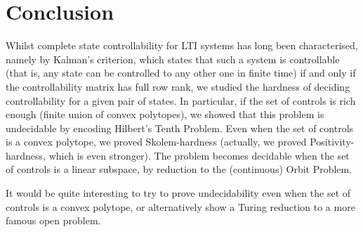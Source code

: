 \section{Conclusion}

Whilst complete state controllability for LTI systems has long been characterised, namely by Kalman's criterion, which states that such a system is controllable (that is, any state can be controlled to any other one in finite time) if and only if the controllability matrix has full row rank, we studied the hardness of deciding controllability for a given pair of states. In particular, if the set of controls is rich enough (finite union of convex polytopes), we showed that this problem is undecidable by encoding Hilbert's Tenth Problem. Even when the set of controls is a convex polytope, we proved Skolem-hardness (actually, we proved Positivity-hardness, which is even stronger). The problem becomes decidable when the set of controls is a linear subspace, by reduction to the (continuous) Orbit Problem.

It would be quite interesting to try to prove undecidability even when the set of controls is a convex polytope, or alternatively show a Turing reduction to a more famous open problem.
